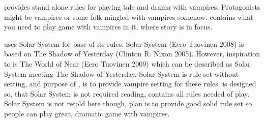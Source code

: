 \ThisBook{} provides stand alone rules for playing tale and drama with vampires.
Protagonists might be vampires or some folk mingled with vampires somehow.
\ThisBook{} contains what you need to play game with vampires in it, where story is in focus.

\ThisBook{} uses Solar System for base of its rules.
Solar System (Eero Tuovinen 2008) is based on The Shadow of Yesterday (Clinton R. Nixon 2005).
However, inspiration to \thisBook{} is The World of Near (Eero Tuovinen 2009) which can be described as Solar System meeting The Shadow of Yesterday.
Solar System is rule set without setting, and purpose of \thisBook{}, is to provide vampire setting for these rules.
\ThisBook{} is designed so, that Solar System is not required reading, \thisBook{} contains all rules needed of play. %
Solar System is not retold here though, plan is to provide good solid rule set so people can play great, dramatic game with vampires.

\pagebreak
